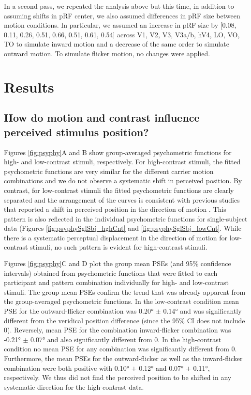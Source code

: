 In a second pass, we repeated the analysis above but this time, in addition to assuming shifts in pRF center, we also assumed differences in pRF size between motion conditions. In particular, we assumed an increase in pRF size by [0.08, 0.11, 0.26, 0.51, 0.66, 0.51, 0.61,  0.54] across V1, V2, V3, V3a/b, hV4, LO, VO, TO to simulate inward motion and a decrease of the same order to simulate outward motion. To simulate flicker motion, no changes were applied.

\section{Results}
\subsection{How do motion and contrast influence perceived stimulus position?}
Figures \ref{fig:psyphy}A and B show group-averaged psychometric functions for high- and low-contrast stimuli, respectively. For high-contrast stimuli, the fitted psychometric functions are very similar for the different carrier motion combinations and we do not observe a systematic shift in perceived position. By contrast, for low-contrast stimuli the fitted psychometric functions are clearly separated and the arrangement of the curves is consistent with previous studies that reported a shift in perceived position in the direction of motion \parencite{Ramachandran1990, DeValois1991, Nishida1999, Fu2001, McGraw2002, Chung2007, Arnold2007, Kwon2015}. This pattern is also reflected in the individual psychometric functions for single-subject data (Figures \ref{fig:psyphySglSbj_hghCnt} and \ref{fig:psyphySglSbj_lowCnt}. While there is a systematic perceptual displacement in the direction of motion for low-contrast stimuli, no such pattern is evident for high-contrast stimuli.

Figures \ref{fig:psyphy}C and D plot the group mean PSEs (and 95\% confidence intervals) obtained from psychometric functions that were fitted to each participant and pattern combination individually for high- and low-contrast stimuli. The group mean PSEs confirm the trend that was already apparent from the group-averaged psychometric functions. In the low-contrast condition mean PSE for the outward-flicker combination was 0.20° $\pm$ 0.14° and was significantly different from the veridical position difference (since the 95\% CI does not include 0). Reversely, mean PSE for the combination inward-flicker combination was -0.21° $\pm$ 0.07° and also significantly different from 0. In the high-contrast condition no mean PSE for any combination was significantly different from 0. Furthermore, the mean PSEs for the outward-flicker as well as the inward-flicker combination were both positive with 0.10° $\pm$ 0.12° and 0.07° $\pm$ 0.11°, respectively. We thus did not find the perceived position to be shifted in any systematic direction for the high-contrast data.

